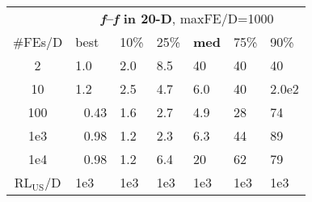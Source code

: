 \begin{tabular}{c|llllll}
 & \multicolumn{6}{|c}{\textbf{\textit{f}\raisebox{-0.35ex}{1}--\textit{f}\raisebox{-0.35ex}{24} in 20-D}, maxFE/D=1000}\\
\#FEs/D & best & 10\% & 25\% & \textbf{med} & 75\% & 90\%\\
2 & \hspace*{1ex}1.0 & \hspace*{1ex}2.0 & \hspace*{1ex}8.5 & 40 & 40 & 40\\
10 & \hspace*{1ex}1.2 & \hspace*{1ex}2.5 & \hspace*{1ex}4.7 & \hspace*{1ex}6.0 & 40 & 2.0e2\\
100 & ~\,0.43 & \hspace*{1ex}1.6 & \hspace*{1ex}2.7 & \hspace*{1ex}4.9 & 28 & 74\\
1e3 & ~\,0.98 & \hspace*{1ex}1.2 & \hspace*{1ex}2.3 & \hspace*{1ex}6.3 & 44 & 89\\
1e4 & ~\,0.98 & \hspace*{1ex}1.2 & \hspace*{1ex}6.4 & 20 & 62 & 79\\
$\text{RL}_{\text{US}}$/D & 1e3 & 1e3 & 1e3 & 1e3 & 1e3 & 1e3
\end{tabular}
